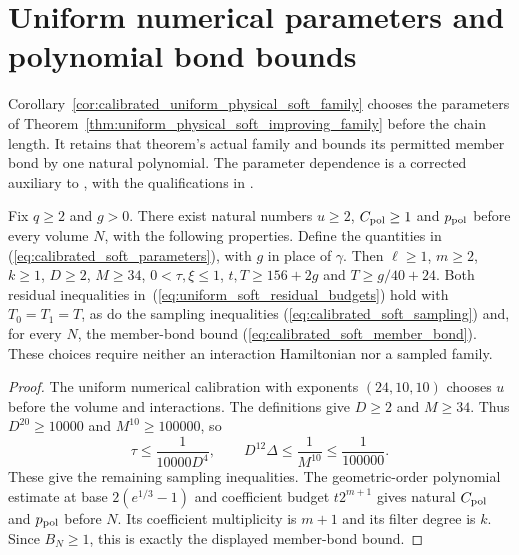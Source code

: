 \section{Uniform numerical parameters and polynomial bond bounds}
\label{sec:uniform_physical_soft_calibration}

Corollary~\ref{cor:calibrated_uniform_physical_soft_family} chooses the
parameters of Theorem~\ref{thm:uniform_physical_soft_improving_family}
before the chain length. It retains that theorem's actual family and
bounds its permitted member bond by one natural polynomial. The
parameter dependence is a corrected auxiliary to
\cite[Proposition~5.7 and Theorem~5.8]{Arad2016RigorousRG}, with the
qualifications in
\cite{gap:alvv16_soft_regional_residuals,gap:alvv16_cluster_approximation}.

\begin{lemma}
    \label{lem:uniform_soft_parameters}
    \leanok
    Fix $q\ge2$ and $g>0$. There exist natural numbers
    $u\ge2$, $C_{\rm pol}\ge1$ and $p_{\rm pol}$ before every volume
    $N$, with the following properties. Define the quantities in
    (\ref{eq:calibrated_soft_parameters}), with $g$ in place of
    $\gamma$. Then $\ell\ge1$, $m\ge2$, $k\ge1$, $D\ge2$, $M\ge34$,
    $0<\tau,\xi\le1$, $t,T\ge156+2g$ and $T\ge g/40+24$.
    Both residual inequalities in~(\ref{eq:uniform_soft_residual_budgets})
    hold with $T_0=T_1=T$, as do the sampling inequalities
    (\ref{eq:calibrated_soft_sampling}) and, for every $N$, the member-bond
    bound (\ref{eq:calibrated_soft_member_bond}). These choices require
    neither an interaction Hamiltonian nor a sampled family.
\end{lemma}
\begin{proof}\leanok
    The uniform numerical calibration with exponents $(24,10,10)$
    chooses $u$ before the volume and interactions. The definitions give
    $D\ge2$ and $M\ge34$. Thus $D^{20}\ge10000$ and
    $M^{10}\ge100000$, so
    \[
        \tau\le\frac1{10000D^4},\qquad
        D^{12}\Delta\le\frac1{M^{10}}\le\frac1{100000}.
    \]
    These give the remaining sampling inequalities. The geometric-order
    polynomial estimate at base $2(e^{1/3}-1)$ and coefficient budget
    $t2^{m+1}$ gives natural $C_{\rm pol}$ and $p_{\rm pol}$ before $N$.
    Its coefficient multiplicity is $m+1$ and its filter degree is $k$.
    Since $B_N\ge1$, this is exactly the displayed member-bond bound.
\end{proof}

